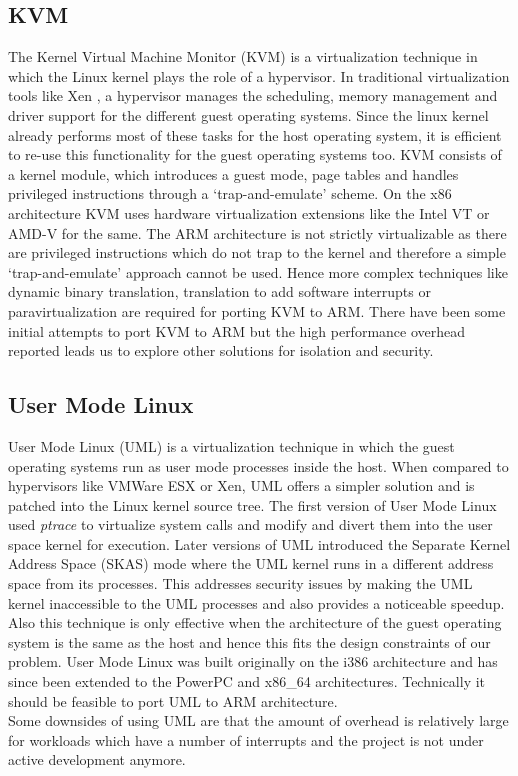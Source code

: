 \subsection{KVM}
The Kernel Virtual Machine Monitor (KVM) is a virtualization technique in which the Linux kernel plays the role of a hypervisor. In traditional virtualization tools like Xen \cite{xen}, a hypervisor manages the scheduling, memory management and driver support for the different guest operating systems. Since the linux kernel already performs most of these tasks for the host operating system, it is efficient to re-use this functionality for the guest operating systems too. KVM consists of a kernel module, which introduces a guest mode,  page tables and handles privileged instructions through a `trap-and-emulate' scheme. On the x86 architecture KVM uses hardware virtualization extensions like the Intel VT or AMD-V for the same. 
The ARM architecture is not strictly virtualizable as there are privileged instructions which do not trap to the kernel and therefore a simple `trap-and-emulate' approach cannot be used. Hence more complex techniques like dynamic binary translation, translation to add software interrupts or paravirtualization are required for porting KVM to ARM. There have been some initial attempts to port KVM to ARM \cite{columbia} but the high performance overhead reported leads us to explore other solutions for isolation and security. 

\subsection{User Mode Linux}
User Mode Linux (UML) is a virtualization technique in which the guest operating systems run as user mode processes inside the host. When compared to hypervisors like VMWare ESX or Xen, UML offers a simpler solution and is patched into the Linux kernel source tree. The first version of User Mode Linux used \emph{ptrace} to virtualize system calls and modify and divert them into the user space kernel for execution. Later versions of UML introduced the Separate Kernel Address Space (SKAS) mode  where the UML kernel runs in a different address space from its processes. This addresses security issues by making the UML kernel inaccessible to the UML processes and also provides a noticeable speedup. Also this technique is only effective when the architecture of the guest operating system is the same as the host and hence this fits the design constraints of our problem. User Mode Linux was built originally on the i386 architecture and has since been extended to the PowerPC and x86\_64 architectures. Technically it should be feasible to port UML to ARM architecture. \\
Some downsides of using UML are that the amount of overhead is relatively large for workloads which have a number of interrupts and the project is not under active development anymore.


